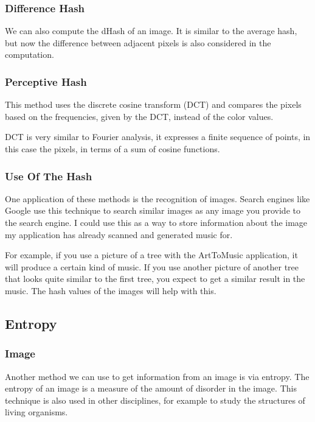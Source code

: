 \documentclass[12pt]{article}
\begin{document}
\subsubsection{Difference Hash}
We can also compute the dHash of an image. It is similar to the average hash, but now the difference between adjacent pixels is also considered in the computation.

\subsubsection{Perceptive Hash}
This method uses the discrete cosine transform (DCT) and compares the pixels based on the frequencies, given by the DCT, instead of the color values.

DCT is very similar to Fourier analysis, it expresses a finite sequence of points, in this case the pixels, in terms of a sum of cosine functions.

\subsubsection{Use Of The Hash}
One application of these methods is the recognition of images. Search engines like Google use this technique to search similar images as any image you provide to the search engine. I could use this as a way to store information about the image my application has already scanned and generated music for.
\newline

For example, if you use a picture of a tree with the ArtToMusic application, it will produce a certain kind of music. If you use another picture of another tree that looks quite similar to the first tree, you expect to get a similar result in the music. The hash values of the images will help with this. 

\subsection{Entropy}

\subsubsection{Image}

Another method we can use to get information from an image is via entropy.
The entropy of an image is a measure of the amount of disorder in the image. This technique is also used in other disciplines, for example to study the structures of living organisms.
\newline
\end{document}
